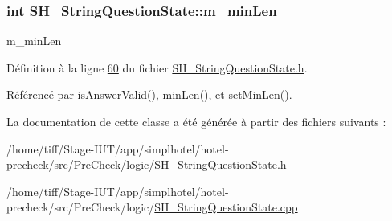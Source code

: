 \hypertarget{classSH__StringQuestionState_a0efb97212b868551f4d46487fa3b0464}{
\subsubsection[{m\-\_\-min\-Len}]{\setlength{\rightskip}{0pt plus 5cm}int S\-H\-\_\-\-String\-Question\-State\-::m\-\_\-min\-Len\hspace{0.3cm}{\ttfamily [private]}}}\label{classSH__StringQuestionState_a0efb97212b868551f4d46487fa3b0464}


m\-\_\-min\-Len 



Définition à la ligne \hyperlink{SH__StringQuestionState_8h_source_l00060}{60} du fichier \hyperlink{SH__StringQuestionState_8h_source}{S\-H\-\_\-\-String\-Question\-State.\-h}.



Référencé par \hyperlink{classSH__StringQuestionState_a51448b87ffdb9279eaa5e7cc3ff73ce9}{is\-Answer\-Valid()}, \hyperlink{classSH__StringQuestionState_a24a95c3ce141e5e26f789720c59d2d3e}{min\-Len()}, et \hyperlink{classSH__StringQuestionState_adf29a14672e2913642f75e61bfed5818}{set\-Min\-Len()}.



La documentation de cette classe a été générée à partir des fichiers suivants \-:\begin{DoxyCompactItemize}
\item 
/home/tiff/\-Stage-\/\-I\-U\-T/app/simplhotel/hotel-\/precheck/src/\-Pre\-Check/logic/\hyperlink{SH__StringQuestionState_8h}{S\-H\-\_\-\-String\-Question\-State.\-h}\item 
/home/tiff/\-Stage-\/\-I\-U\-T/app/simplhotel/hotel-\/precheck/src/\-Pre\-Check/logic/\hyperlink{SH__StringQuestionState_8cpp}{S\-H\-\_\-\-String\-Question\-State.\-cpp}\end{DoxyCompactItemize}
